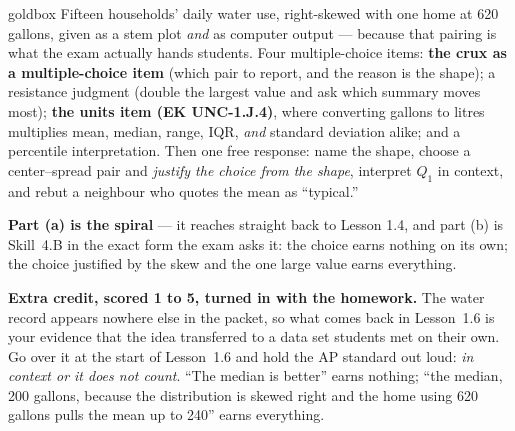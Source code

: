 \documentclass[10pt]{article}
\begin{document}
\boxguard
\begin{skillbox}{goldbox}
Fifteen households' daily water use, right-skewed with one home at 620 gallons, given as a
stem plot \emph{and} as computer output --- because that pairing is what the exam actually hands
students. Four multiple-choice items: \textbf{the crux as a multiple-choice item} (which pair to
report, and the reason is the shape); a resistance judgment (double the largest value and ask
which summary moves most); \textbf{the units item (EK UNC-1.J.4)}, where converting gallons to
litres multiplies mean, median, range, IQR, \emph{and} standard deviation alike; and a
percentile interpretation. Then one free response: name the shape, choose a center--spread pair
and \emph{justify the choice from the shape}, interpret $Q_1$ in context, and rebut a neighbour
who quotes the mean as ``typical.''

\textbf{Part (a) is the spiral} --- it reaches straight back to Lesson 1.4, and part (b) is
Skill~4.B in the exact form the exam asks it: the choice earns nothing on its own; the choice
justified by the skew and the one large value earns everything.

\textbf{Extra credit, scored 1 to 5, turned in with the homework.} The water
record appears nowhere else in the packet, so what comes back in Lesson~1.6 is your evidence
that the idea transferred to a data set students met on their own. Go over it at the start of
Lesson~1.6 and hold the AP standard out loud: \emph{in context or it does not count}. ``The
median is better'' earns nothing; ``the median, 200 gallons, because the distribution is skewed
right and the home using 620 gallons pulls the mean up to 240'' earns everything.
\end{skillbox}
\end{document}
